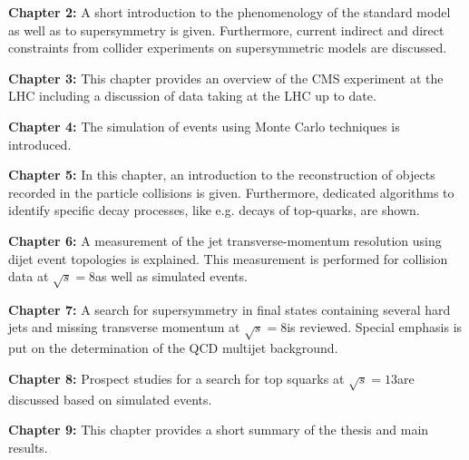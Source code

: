 \begin{description}
 \item \textbf{Chapter 2:} A short introduction to the phenomenology of the standard model as well as to supersymmetry is given. Furthermore, current indirect and direct constraints from collider experiments on supersymmetric models are discussed.
 \item \textbf{Chapter 3:} This chapter provides an overview of the CMS experiment at the LHC including a discussion of data taking at the LHC up to date.
 \item \textbf{Chapter 4:} The simulation of events using Monte Carlo techniques is introduced.
 \item \textbf{Chapter 5:} In this chapter, an introduction to the reconstruction of objects recorded in the particle collisions is given. Furthermore, dedicated algorithms to identify specific decay processes, like e.g. decays of top-quarks, are shown.
 \item \textbf{Chapter 6:} A measurement of the jet transverse-momentum resolution using dijet event topologies is explained. This measurement is performed for \pp collision data at $\sqrt{s} = 8$\tev as well as simulated events.
 \item \textbf{Chapter 7:} A search for supersymmetry in final states containing several hard jets and missing transverse momentum at $\sqrt{s} = 8$\tev is reviewed. Special emphasis is put on the determination of the QCD multijet background.
 \item \textbf{Chapter 8:} Prospect studies for a search for top squarks at $\sqrt{s} = 13$\tev are discussed based on simulated events.
 \item \textbf{Chapter 9:} This chapter provides a short summary of the thesis and main results.
\end{description}